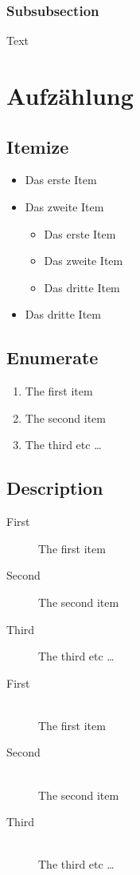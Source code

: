\documentclass[a4,12pt]{scrartcl}
\begin{document}
\subsubsection{Subsubsection}
Text

\section{Aufzählung}
\subsection{Itemize}
\begin{itemize}
\item Das erste Item
\item Das zweite Item
\begin{itemize}
\item Das erste Item
\item Das zweite Item
\item Das dritte Item
\end{itemize}
\item Das dritte Item
\end{itemize}

\subsection{Enumerate}
\begin{enumerate}
  \item The first item
  \item The second item
  \item The third etc \ldots
\end{enumerate}

\subsection{Description}
\begin{description}
  \item[First] The first item
  \item[Second] The second item
  \item[Third] The third etc \ldots
\end{description}
\begin{description}
  \item[First] \hfill \\
  The first item
  \item[Second] \hfill \\
  The second item
  \item[Third] \hfill \\
  The third etc \ldots
\end{description}
\end{document}
